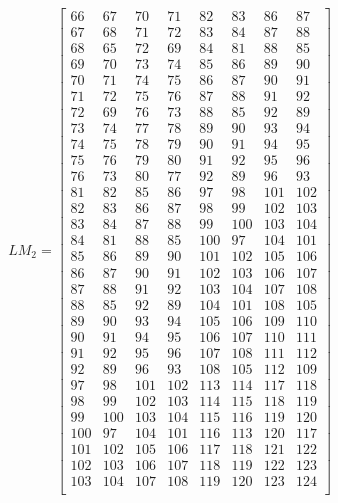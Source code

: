\documentclass[10pt]{article}
\begin{document}
\begin{equation}
LM_2=
\begin{bmatrix}
66 & 67 & 70 & 71 & 82 & 83 & 86 & 87\\
67 & 68 & 71 & 72 & 83 & 84 & 87 & 88\\
68 & 65 & 72 & 69 & 84 & 81 & 88 & 85\\
69 & 70 & 73 & 74 & 85 & 86 & 89 & 90\\
70 & 71 & 74 & 75 & 86 & 87 & 90 & 91\\
71 & 72 & 75 & 76 & 87 & 88 & 91 & 92\\
72 & 69 & 76 & 73 & 88 & 85 & 92 & 89\\
73 & 74 & 77 & 78 & 89 & 90 & 93 & 94\\
74 & 75 & 78 & 79 & 90 & 91 & 94 & 95\\
75 & 76 & 79 & 80 & 91 & 92 & 95 & 96\\
76 & 73 & 80 & 77 & 92 & 89 & 96 & 93\\
81 & 82 & 85 & 86 & 97 & 98 & 101 & 102\\
82 & 83 & 86 & 87 & 98 & 99 & 102 & 103\\
83 & 84 & 87 & 88 & 99 & 100 & 103 & 104\\
84 & 81 & 88 & 85 & 100 & 97 & 104 & 101\\
85 & 86 & 89 & 90 & 101 & 102 & 105 & 106\\
86 & 87 & 90 & 91 & 102 & 103 & 106 & 107\\
87 & 88 & 91 & 92 & 103 & 104 & 107 & 108\\
88 & 85 & 92 & 89 & 104 & 101 & 108 & 105\\
89 & 90 & 93 & 94 & 105 & 106 & 109 & 110\\
90 & 91 & 94 & 95 & 106 & 107 & 110 & 111\\
91 & 92 & 95 & 96 & 107 & 108 & 111 & 112\\
92 & 89 & 96 & 93 & 108 & 105 & 112 & 109\\
97 & 98 & 101 & 102 & 113 & 114 & 117 & 118\\
98 & 99 & 102 & 103 & 114 & 115 & 118 & 119\\
99 & 100 & 103 & 104 & 115 & 116 & 119 & 120\\
100 & 97 & 104 & 101 & 116 & 113 & 120 & 117\\
101 & 102 & 105 & 106 & 117 & 118 & 121 & 122\\
102 & 103 & 106 & 107 & 118 & 119 & 122 & 123\\
103 & 104 & 107 & 108 & 119 & 120 & 123 & 124\\

\end{bmatrix}
\end{equation}
\end{document}
